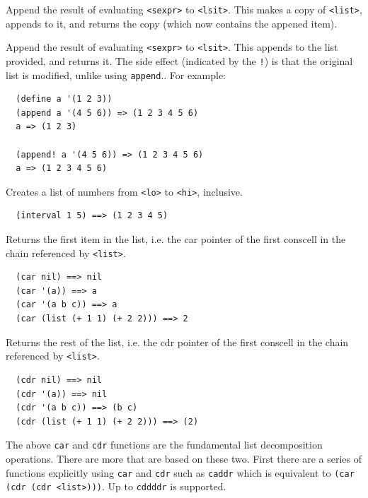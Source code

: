 \documentclass[12pt]{article}
\begin{document}

Append the result of evaluating \verb|<sexpr>| to \verb|<lsit>|. This
makes a copy of \verb|<list>|, appends to it, and returns the copy
(which now contains the appened item).


Append the result of evaluating \verb|<sexpr>| to \verb|<lsit>|. This
appends to the list provided, and returns it. The side effect
(indicated by the \verb|!|) is that the original list is modified,
unlike using \verb|append|..
For example:

\begin{verbatim}
  (define a '(1 2 3))
  (append a '(4 5 6)) => (1 2 3 4 5 6)
  a => (1 2 3)

  (append! a '(4 5 6)) => (1 2 3 4 5 6)
  a => (1 2 3 4 5 6)  
\end{verbatim}


Creates a list of numbers from \verb|<lo>| to \verb|<hi>|, inclusive.

\begin{verbatim}
  (interval 1 5) ==> (1 2 3 4 5)
\end{verbatim}


Returns the first item in the list, i.e. the car pointer of the first
conscell in the chain referenced by \verb|<list>|.

\begin{verbatim}
  (car nil) ==> nil
  (car '(a)) ==> a
  (car '(a b c)) ==> a
  (car (list (+ 1 1) (+ 2 2))) ==> 2
\end{verbatim}


Returns the rest of the list, i.e. the cdr pointer of the first
conscell in the chain referenced by \verb|<list>|.

\begin{verbatim}
  (cdr nil) ==> nil
  (cdr '(a)) ==> nil
  (cdr '(a b c)) ==> (b c)  
  (cdr (list (+ 1 1) (+ 2 2))) ==> (2)
\end{verbatim}

The above \verb|car| and \verb|cdr| functions are the fundamental list
decomposition operations. There are more that are based on these two.
First there are a series of functions explicitly using \verb|car| and
\verb|cdr| such as \verb|caddr| which is equivalent to
\verb|(car (cdr (cdr <list>)))|. Up to \verb|cddddr| is supported.
\end{document}

